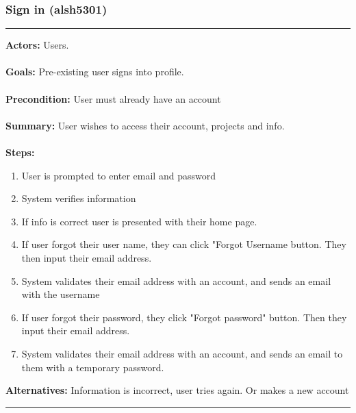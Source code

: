\documentclass[11pt]{report}
\begin{document}
\subsubsection{Sign in (alsh5301)}
\vspace{2pt}
\hrule
\vspace{8pt}
 \textbf{Actors:} Users. \\ \\
\textbf{Goals:} Pre-existing user signs into profile. \\ \\
\textbf{Precondition:} User must already have an account \\ \\
\textbf{Summary:} User wishes to access their account, projects and info. \\ \\
\textbf{Steps:} \begin{enumerate}
  \item User is prompted to enter email and password 
  \item System verifies information
  \item If info is correct user is presented with their home page. 
  \item If user forgot their user name, they can click "Forgot Username button. They then input their email address.
  \item System validates their email address with an account, and sends an email with the username  
  \item If user forgot their password, they click "Forgot password" button. Then they input their email address.
  \item System validates their email address with an account, and sends an email to them with a temporary password.
 \end{enumerate}
 \textbf{Alternatives:} Information is incorrect, user tries again. Or makes a new account \\
\vspace{8pt}
\hrule
\newpage
\end{document}
